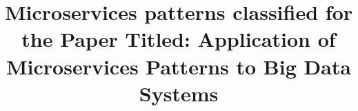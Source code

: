 \documentclass[conference]{IEEEtran}
\begin{document}
\title{Microservices patterns classified for the Paper Titled: Application of Microservices Patterns to Big Data Systems\\
}


\maketitle


\end{document}
